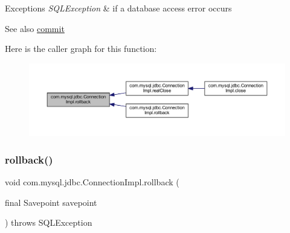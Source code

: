 \begin{DoxyExceptions}{Exceptions}
{\em S\+Q\+L\+Exception} & if a database access error occurs \\
\hline
\end{DoxyExceptions}
\begin{DoxySeeAlso}{See also}
\mbox{\hyperlink{classcom_1_1mysql_1_1jdbc_1_1_connection_impl_aa2c8c829d30458f22f7785396eb18af1}{commit}} 
\end{DoxySeeAlso}
Here is the caller graph for this function\+:\nopagebreak
\begin{figure}[H]
\begin{center}
\leavevmode
\includegraphics[width=350pt]{classcom_1_1mysql_1_1jdbc_1_1_connection_impl_a62b6461dc72ef3c739da196995cb9786_icgraph}
\end{center}
\end{figure}
\mbox{\label{classcom_1_1mysql_1_1jdbc_1_1_connection_impl_a2e3bce3038d1c58eedcfdfe49c82f904}} 
\subsubsection{\texorpdfstring{rollback()}{rollback()}\hspace{0.1cm}{\footnotesize\ttfamily [2/2]}}
{\footnotesize\ttfamily void com.\+mysql.\+jdbc.\+Connection\+Impl.\+rollback (\begin{DoxyParamCaption}\item[{final Savepoint}]{savepoint }\end{DoxyParamCaption}) throws S\+Q\+L\+Exception}

